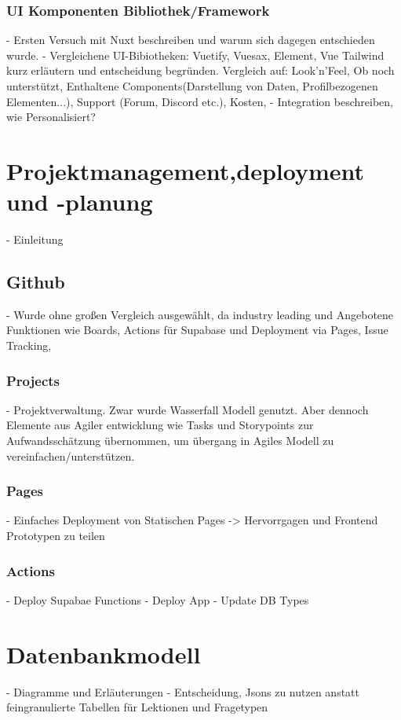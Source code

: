 \subsubsection{UI Komponenten Bibliothek/Framework}
- Ersten Versuch mit Nuxt beschreiben und warum sich dagegen entschieden wurde.
- Vergleichene UI-Bibiotheken: Vuetify, Vuesax, Element, Vue Tailwind kurz erläutern und entscheidung begründen. Vergleich auf: Look'n'Feel, Ob noch unterstützt, Enthaltene Components(Darstellung von Daten, Profilbezogenen Elementen...), Support (Forum, Discord etc.), Kosten, 
- Integration beschreiben, wie Personalisiert?

\section{Projektmanagement,deployment und -planung}
- Einleitung

\subsection{Github}
- Wurde ohne großen Vergleich ausgewählt, da industry leading und Angebotene Funktionen wie Boards, Actions für Supabase und Deployment via Pages, Issue Tracking,

\subsubsection{Projects}
- Projektverwaltung. Zwar wurde Wasserfall Modell genutzt. Aber dennoch Elemente aus Agiler entwicklung wie Tasks und Storypoints zur Aufwandsschätzung übernommen, um übergang in Agiles Modell zu vereinfachen/unterstützen.

\subsubsection{Pages}
- Einfaches Deployment von Statischen Pages -> Hervorrgagen und Frontend Prototypen zu teilen

\subsubsection{Actions}
- Deploy Supabae Functions
- Deploy App
- Update DB Types

\section{Datenbankmodell}
- Diagramme und Erläuterungen
- Entscheidung, Jsons zu nutzen anstatt feingranulierte Tabellen für Lektionen und Fragetypen

